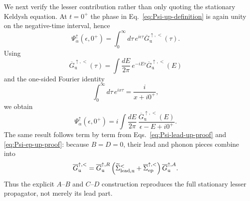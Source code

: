 \documentclass[
 reprint,
 superscriptaddress,
 amsmath,amssymb,
 aps,prb,
 longbibliography,
 floatfix
]{revtex4-2}
\newcommand{\ep}{\mathrm{ep}}
\newcommand{\barSigma}{\overline{\Sigma}}
\begin{document}
We next verify the lesser contribution rather than only quoting the stationary Keldysh equation. At $t=0^+$ the phase in Eq.~\eqref{eq:Psi-up-definition} is again unity on the negative-time interval, hence
\begin{equation*}
\Psi_\alpha^\uparrow(\epsilon,0^+)
=
\int_0^\infty d\tau\,
 e^{i\epsilon\tau}
 \overline G_{\mathrm u}^{\uparrow,<}(\tau).
\end{equation*}
Using
\begin{equation*}
\overline G_{\mathrm u}^{\uparrow,<}(\tau)
=
\int\frac{dE}{2\pi}\,
 e^{-iE\tau}
 \overline G_{\mathrm u}^{\uparrow,<}(E)
\end{equation*}
and the one-sided Fourier identity
\begin{equation}
\int_0^\infty d\tau\,e^{ix\tau}
=
\frac{i}{x+i0^+},
\label{eq:up-t0-one-sided}
\end{equation}
we obtain
\begin{equation}
\Psi_\alpha^\uparrow(\epsilon,0^+)
=
 i\int\frac{dE}{2\pi}\,
 \frac{\overline G_{\mathrm u}^{\uparrow,<}(E)}
 {\epsilon-E+i0^+}.
\label{eq:up-t0-Psi-spectral}
\end{equation}
The same result follows term by term from Eqs.~\eqref{eq:Psi-lead-up-proof} and \eqref{eq:Psi-ep-up-proof}: because $B=D=0$, their lead and phonon pieces combine into
\begin{equation*}
\overline G_{\mathrm u}^{\uparrow,<}
=
\overline G_{\mathrm u}^{\uparrow,R}
\left(
\widetilde\Sigma_{\rm lead,u}^<
+
\barSigma_{\ep}^{\uparrow,<}
\right)
\overline G_{\mathrm u}^{\uparrow,A}.
\end{equation*}
Thus the explicit $A$--$B$ and $C$--$D$ construction reproduces the full stationary lesser propagator, not merely its lead part.
\end{document}
